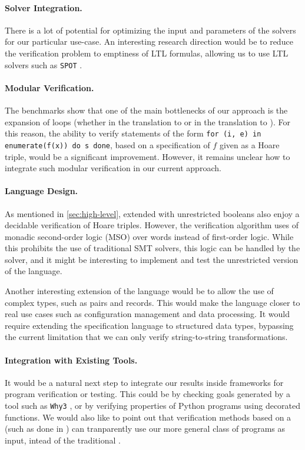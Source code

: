 \paragraph{Solver Integration.} There is a lot of potential for optimizing the
input and parameters of the solvers for our particular use-case. An interesting
research direction would be to reduce the verification problem to emptiness of
LTL formulas, allowing us to use LTL solvers such as \texttt{SPOT} \cite{SPOT}.

\paragraph{Modular Verification.} The benchmarks show that one of the main
bottlenecks of our approach is the expansion of loops (whether in the
translation to  or in the translation to
). For this reason, the ability to verify
statements of the form \texttt{for (i, e) in enumerate(f(x)) do s done}, based
on a specification of $f$ given as a Hoare triple, would be a significant
improvement. However, it remains unclear how to integrate such modular
verification in our current approach.

\paragraph{Language Design.} As mentioned in
\cref{sec:high-level}, 
extended with unrestricted booleans also enjoy a decidable verification of
Hoare triples. However, the verification algorithm uses of monadic second-order
logic (MSO) over words instead of first-order logic. While this prohibits the
use of traditional SMT solvers, this logic can be handled by the 
solver, and it might be interesting to implement and test the unrestricted
version of the language. 

Another interesting extension of the language would be to allow the use of
complex types, such as pairs and records. This would make the language closer
to real use cases such as configuration management and data processing. It
would require extending the specification language to structured data types,
bypassing the current limitation that we can only verify string-to-string
transformations.


\paragraph{Integration with Existing Tools.} It would be a natural next step to
integrate our results inside frameworks for program verification or testing.
This could be by checking goals generated by a tool such as \texttt{Why3}
\cite{Why3}, or by verifying properties of Python programs using decorated
functions. We would also like to point out that verification methods based on a
 (such as done in \cite{CHLRW19}) can
tranparently use our more general class of programs as input, intead of the
traditional . 
